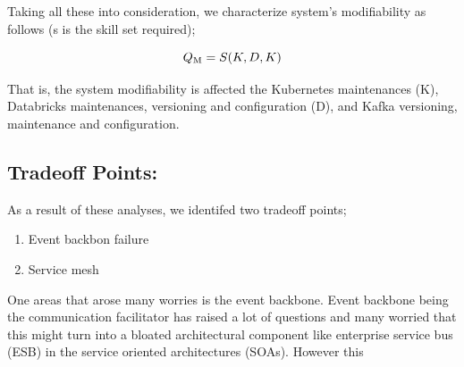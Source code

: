 \documentclass[review]{elsarticle}
\begin{document}
Taking all these into consideration, we characterize system's modifiability as follows (s is the skill set required);

\begin{equation}
    Q\textsubscript{M} = S(K, D, K)
\end{equation}

That is, the system modifiability is affected the Kubernetes maintenances (K), Databricks maintenances, versioning and configuration (D), and Kafka versioning, maintenance and configuration.

\subsection{Tradeoff Points:}

As a result of these analyses, we identifed two tradeoff points; 

\begin{enumerate}
    \item Event backbon failure
    \item Service mesh 
\end{enumerate}

One areas that arose many worries is the event backbone. Event backbone being the communication facilitator has raised a lot of questions and many worried that this might turn into a bloated architectural component like enterprise service bus (ESB) in the service oriented architectures (SOAs). However this 


\end{document}
